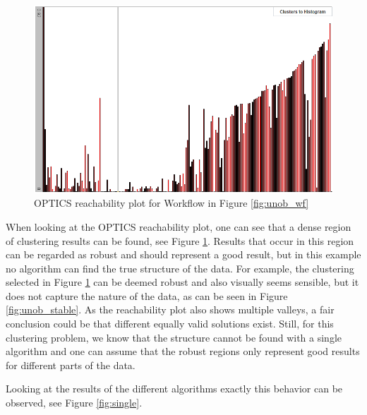 \documentclass[
	a4paper,
	english,
	twoside,
	openright,               
	11pt                            
	]{report}
\begin{document}
\begin{figure}[h]
	\centering
	\includegraphics[scale=.4]{unob_optics_stable}
	\caption{OPTICS reachability plot for Workflow in Figure \ref{fig:unob_wf}}
	\label{fig:unob_optics_stable}
\end{figure}

When looking at the OPTICS reachability plot, one can see that a dense region of clustering results can be found, see Figure \ref{fig:unob_optics_stable}. Results that occur in this region can be regarded as robust and should represent a good result, but in this example no algorithm can find the true structure of the data. For example, the clustering selected in Figure \ref{fig:unob_optics_stable} can be deemed robust and also visually seems sensible, but it does not capture the nature of the data, as can be seen in Figure \ref{fig:unob_stable}. As the reachability plot also shows multiple valleys, a fair conclusion could be that different equally valid solutions exist. Still, for this clustering problem, we know that the structure cannot be found with a single algorithm and one can assume that the robust regions only represent good results for different parts of the data. 

Looking at the results of the different algorithms exactly this behavior can be observed, see Figure \ref{fig:single}.
\end{document}
